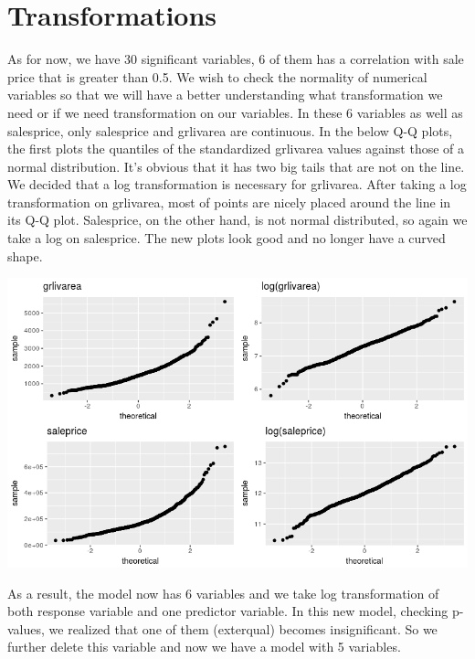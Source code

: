 \documentclass[12pt]{article}
\begin{document}
\begin{flushleft}
\begin{samepage}
\end{samepage}
\centering
\section{Transformations}
\begin{flushleft}

As for now, we have 30 significant variables, 6 of them has a correlation with sale price that is greater than 0.5. We wish to check the normality of numerical variables so that we will have a better understanding what transformation we need or if we need transformation on our variables. In these 6 variables as well as salesprice, only salesprice and grlivarea are continuous. In the below Q-Q plots, the first plots the quantiles of the standardized grlivarea values against those of a normal distribution. It’s obvious that it has two big tails that are not on the line. We decided that a log transformation is necessary for grlivarea. After taking a log transformation on grlivarea, most of points are nicely placed around the line in its Q-Q plot. Salesprice, on the other hand, is not normal distributed, so again we take a log on salesprice. The new plots look good and no longer have a curved shape.
\end{flushleft}
\centering
    \vspace*{0.5 cm}
    \includegraphics[scale = .5]{qq.png}\\[1.0 cm]	
\begin{flushleft}

As a result, the model now has 6 variables and we take log transformation of both response variable and one predictor variable. In this new model, checking p-values, we realized that one of them (exterqual) becomes insignificant. So we further delete this variable and now we have a model with 5 variables.
\end{flushleft}

\end{flushleft}
\end{document}
